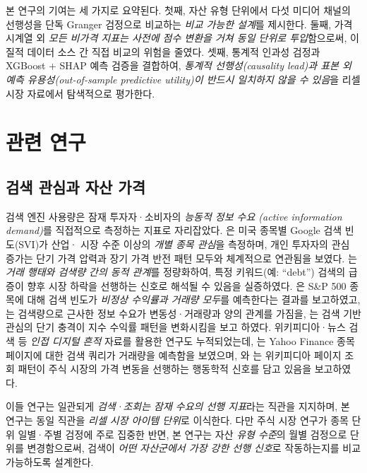 \documentclass[11pt, a4paper, twocolumn]{article}
\begin{document}
본 연구의 기여는 세 가지로 요약된다. 첫째, 자산 유형 단위에서 다섯
미디어 채널의 선행성을 단독 Granger 검정으로 비교하는 \emph{비교
가능한 설계}를 제시한다. 둘째, 가격 시계열 외 \emph{모든 비가격 지표는
사전에 점수 변환을 거쳐 동일 단위로 투입}함으로써, 이질적 데이터
소스 간 직접 비교의 위험을 줄였다. 셋째, 통계적 인과성 검정과 XGBoost
+ SHAP 예측 검증을 결합하여, \emph{통계적 선행성(causality lead)과
표본 외 예측 유용성(out-of-sample predictive utility)이 반드시 일치하지
않을 수 있음}을 리셀 시장 자료에서 탐색적으로 평가한다.

\section{관련 연구}\label{sec:related}

\subsection{검색 관심과 자산 가격}
검색 엔진 사용량은 잠재 투자자·소비자의 \emph{능동적 정보 수요
(active information demand)}를 직접적으로 측정하는 지표로 자리잡았다.
\citet{daengelberggao2011}은 미국 종목별 Google 검색 빈도(SVI)가 산업·
시장 수준 이상의 \emph{개별 종목 관심}을 측정하며, 개인 투자자의
관심 증가는 단기 가격 압력과 장기 가격 반전 패턴 모두와 체계적으로
연관됨을 보였다. \citet{preismoatstanley2013}는 \emph{거래
행태와 검색량 간의 동적 관계}를 정량화하여, 특정 키워드(예: ``debt'')
검색의 급증이 향후 시장 하락을 선행하는 신호로 해석될 수 있음을
실증하였다. \citet{josephwintokizhang2011}은 S\&P 500 종목에 대해
검색 빈도가 \emph{비정상 수익률과 거래량 모두}를 예측한다는 결과를
보고하였고, \citet{vlastakismarkellos2012}는 검색량으로 근사한 정보
수요가 변동성·거래량과 양의 관계를 가짐을, \citet{vozlyublennaia2014}는
검색 기반 관심의 단기 충격이 지수 수익률 패턴을 변화시킴을 보고
하였다. 위키피디아·뉴스 검색 등 \emph{인접 디지털 흔적} 자료를 활용한
연구도 누적되었는데, \citet{bordinoetal2012}는 Yahoo Finance 종목
페이지에 대한 검색 쿼리가 거래량을 예측함을 보였으며, \citet{moatetal2013}와
\citet{curmeetal2014}는 위키피디아 페이지 조회 패턴이 주식 시장의 가격
변동을 선행하는 행동학적 신호를 담고 있음을 보고하였다.

이들 연구는 일관되게 \emph{검색·조회는 잠재 수요의 선행 지표}라는
직관을 지지하며, 본 연구는 동일 직관을 \emph{리셀 시장 아이템 단위}로
이식한다. 다만 주식 시장 연구가 종목 단위 일별·주별 검정에 주로
집중한 반면, 본 연구는 자산 \emph{유형 수준}의 월별 검정으로 단위를
변경함으로써, 검색이 \emph{어떤 자산군에서 가장 강한 선행 신호}로
작동하는지를 비교 가능하도록 설계한다.
\end{document}

